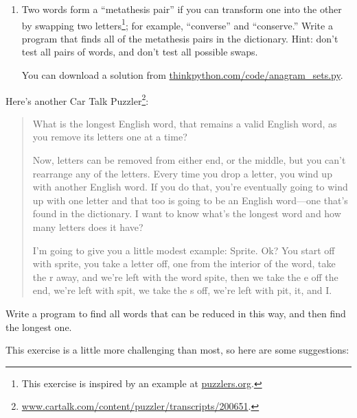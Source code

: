 \documentclass[10pt]{book}
\begin{document}
{\begin{ex}
\begin{enumerate}


\item Two words form a ``metathesis pair'' if you can transform one
  into the other by swapping two letters\footnote{This exercise is
    inspired by an example at \url{puzzlers.org}.}; for example,
  ``converse'' and ``conserve.''  Write a program that finds all of
  the metathesis pairs in the dictionary.  Hint: don't test all pairs
  of words, and don't test all possible swaps.

You can download a solution from \url{thinkpython.com/code/anagram_sets.py}.

\end{enumerate}
\end{ex}



\begin{ex}


Here's another Car Talk Puzzler\footnote{
\url{www.cartalk.com/content/puzzler/transcripts/200651}.}:

\begin{quote}
What is the longest English word, that remains a valid English word,
as you remove its letters one at a time?

Now, letters can be removed from either end, or the middle, but you
can't rearrange any of the letters. Every time you drop a letter, you
wind up with another English word. If you do that, you're eventually
going to wind up with one letter and that too is going to be an
English word---one that's found in the dictionary. I want to know
what's the longest word and how many letters does it
have?

I'm going to give you a little modest example: Sprite. Ok? You start
off with sprite, you take a letter off, one from the interior of the
word, take the r away, and we're left with the word spite, then we
take the e off the end, we're left with spit, we take the s off, we're
left with pit, it, and I.
\end{quote}


Write a program to find all words that can be reduced in this way,
and then find the longest one.

This exercise is a little more challenging than most, so here are
some suggestions:


\end{ex}}
\end{document}
